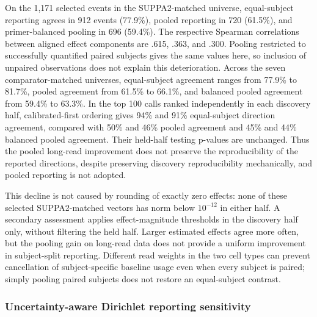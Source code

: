 \documentclass[11pt]{article}
\begin{document}
On the 1,171 selected events in the SUPPA2-matched universe, equal-subject reporting agrees in 912 events (77.9\%), pooled reporting in 720 (61.5\%), and primer-balanced pooling in 696 (59.4\%). The respective Spearman correlations between aligned effect components are .615, .363, and .300. Pooling restricted to successfully quantified paired subjects gives the same values here, so inclusion of unpaired observations does not explain this deterioration. Across the seven comparator-matched universes, equal-subject agreement ranges from 77.9\% to 81.7\%, pooled agreement from 61.5\% to 66.1\%, and balanced pooled agreement from 59.4\% to 63.3\%. In the top 100 calls ranked independently in each discovery half, calibrated-first ordering gives 94\% and 91\% equal-subject direction agreement, compared with 50\% and 46\% pooled agreement and 45\% and 44\% balanced pooled agreement. Their held-half testing p-values are unchanged. Thus the pooled long-read improvement does not preserve the reproducibility of the reported directions, despite preserving discovery reproducibility mechanically, and pooled reporting is not adopted.

This decline is not caused by rounding of exactly zero effects: none of these selected SUPPA2-matched vectors has norm below \(10^{-12}\) in either half. A secondary assessment applies effect-magnitude thresholds in the discovery half only, without filtering the held half. Larger estimated effects agree more often, but the pooling gain on long-read data does not provide a uniform improvement in subject-split reporting. Different read weights in the two cell types can prevent cancellation of subject-specific baseline usage even when every subject is paired; simply pooling paired subjects does not restore an equal-subject contrast.

\subsubsection*{Uncertainty-aware Dirichlet reporting sensitivity}
\end{document}
